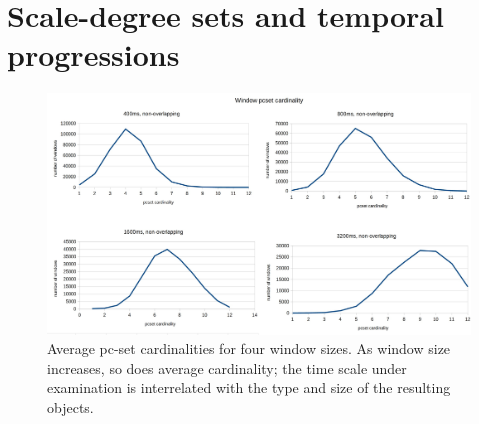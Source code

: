 \section{Scale-degree sets and temporal progressions}


\begin{landscape}
\begin{figure}
	\centering
	\includegraphics[width=8in]{cardinalities.jpg}
	\caption{Average pc-set cardinalities for four window sizes.  As window size increases, so does average cardinality; the time scale under examination is interrelated with the type and size of the resulting objects.}
	\label{cardinalities}
\end{figure}
\end{landscape}


